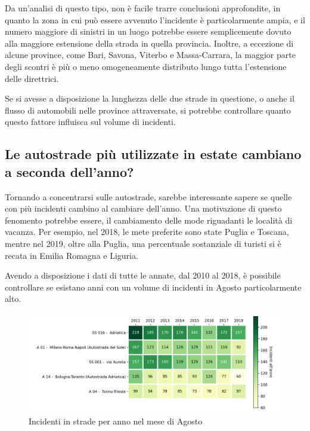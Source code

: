 \documentclass[a4paper,12pt]{report}
\begin{document}
Da un'analisi di questo tipo, non è facile trarre conclusioni approfondite, in quanto la 
zona in cui può essere avvenuto l'incidente è particolarmente ampia, e il numero maggiore di 
sinistri in un luogo potrebbe essere semplicemente dovuto alla maggiore estensione della 
strada in quella provincia. 
Inoltre, a eccezione di alcune province, come Bari, Savona, Viterbo e Massa-Carrara, 
la maggior parte degli scontri è più o meno omogeneamente distributo lungo tutta 
l'estensione delle direttrici. 

Se si avesse a disposizione la lunghezza delle due strade in questione, 
o anche il flusso di automobili nelle province attraversate, 
si potrebbe controllare quanto questo fattore influisca sul volume di incidenti. 

\subsection{Le autostrade più utilizzate in estate cambiano a seconda dell'anno?}

Tornando a concentrarsi sulle autostrade, sarebbe interessante sapere se quelle 
con più incidenti cambino al cambiare dell'anno.
Una motivazione di questo fenomento potrebbe essere, il cambiamento 
delle mode riguadanti le località di vacanza.
Per esempio, nel 2018, le mete preferite sono state Puglia e 
Toscana\cite{INFOGRAFICA_ISTAT:1}, mentre nel 2019, oltre alla Puglia, 
una percentuale sostanziale di turisti si è recata in 
Emilia Romagna e Liguria\cite{REPORT_ISTAT_2019:1}.

Avendo a disposizione i dati di tutte le annate, dal 2010 al 2018, 
è possibile controllare se esistano anni con un volume di 
incidenti in Agosto particolarmente alto.

\begin{figure}
    \includegraphics[width=\linewidth]{../src/incidenti/incidenti_aci/agosto/vacanze_autostrade.png}
    \caption{Incidenti in strade per anno nel mese di Agosto}
    \label{fig:autostrade-anno}
\end{figure}
\end{document}
